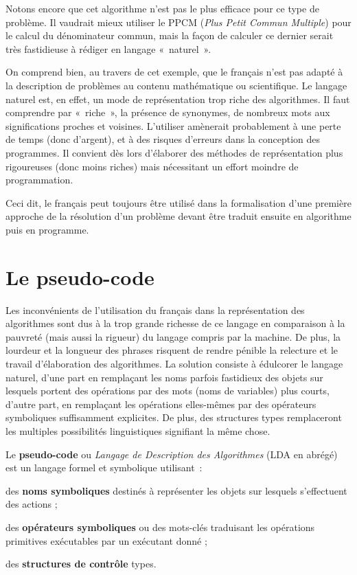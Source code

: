 		Notons encore que cet algorithme n’est pas le
		plus efficace pour ce type de problème. 
		Il vaudrait mieux utiliser le PPCM 
		(\textit{Plus Petit Commun Multiple}) 
		pour le calcul du dénominateur commun, mais la façon
		de calculer ce dernier serait très fastidieuse à rédiger en langage
		«~naturel~».

		On comprend bien, au travers de cet exemple, que
		le français n’est pas adapté à la description de problèmes au contenu
		mathématique ou scientifique. Le langage naturel est, en effet, un mode
		de représentation trop riche des algorithmes. Il faut comprendre par
		«~riche~», la présence de synonymes, de nombreux mots aux
		significations proches et voisines. L’utiliser amènerait probablement à
		une perte de temps (donc d’argent), et à des risques d’erreurs dans la
		conception des programmes. Il convient dès lors d’élaborer des méthodes
		de représentation plus rigoureuses (donc moins riches) mais nécessitant
		un effort moindre de programmation.

		Ceci dit, le français peut toujours être
		utilisé dans la formalisation d’une première approche de la résolution
		d’un problème devant être traduit ensuite en algorithme puis en
		programme.

	\section{Le pseudo-code}
	
		Les inconvénients de l’utilisation du français dans la représentation
		des algorithmes sont dus à la trop grande richesse de ce langage en
		comparaison à la pauvreté (mais aussi la rigueur) du langage compris
		par la machine. De plus, la lourdeur et la longueur des phrases
		risquent de rendre pénible la relecture et le travail d’élaboration des
		algorithmes. La solution consiste à édulcorer le langage naturel, d’une
		part en remplaçant les noms parfois fastidieux des objets sur lesquels
		portent des opérations par des mots (noms de variables) plus courts,
		d’autre part, en remplaçant les opérations elles-mêmes par des
		opérateurs symboliques suffisamment explicites. De plus, des structures
		types remplaceront les multiples possibilités linguistiques signifiant
		la même chose.

		Le \textbf{pseudo-code} ou \textit{Langage de Description des
		Algorithmes} (LDA en abrégé) est un langage formel et symbolique
		utilisant~:

		\begin{liste}
		\item
			des \textbf{noms symboliques} destinés à représenter les objets sur
			lesquels s’effectuent des actions ;
		\item
			des \textbf{opérateurs symboliques} ou des mots-clés traduisant les
			opérations primitives exécutables par un exécutant donné ;
		\item
			des \textbf{structures de contrôle} types.
		\end{liste}

